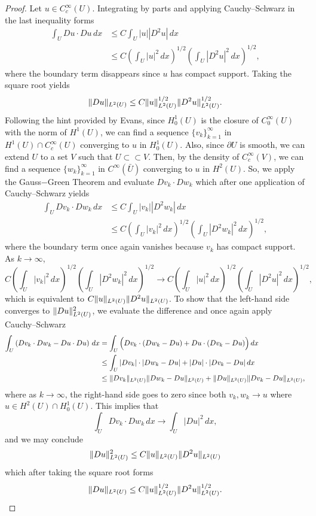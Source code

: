 \documentclass{article}
\DeclarePairedDelimiter{\norm}{\lVert}{\rVert}
\begin{document}
\begin{flushleft}
\begin{proof}
Let $u\in C_c^{\infty}(U)$. Integrating by parts and applying Cauchy–Schwarz in the last inequality forms
\begin{align*}\int_U Du\cdot Du\,dx &\le
C\int_U |u||D^2u|\,dx\quad \\&\le
C\left(\int_U |u|^2\,dx\right)^{1/2}\left(\int_U |D^2u|^2\,dx\right)^{1/2},
\end{align*}
where the boundary term disappears since $u$ has compact support. Taking the square root yields
$$\norm{Du}_{L^2(U)}\le C \norm{u}_{L^2(U)}^{1/2}\norm{D^2u}_{L^2(U)}^{1/2}.$$
Following the hint provided by Evans, since $H_0^1(U)$ is the  closure of $C_0^\infty(U)$ with the norm of $H^1(U)$, we can find a sequence $\{v_k\}_{k=1}^{\infty}$ in $H^1(U)\cap C_c^{\infty}(U)$ converging to $u$ in $H_0^1(U)$. Also, since $\partial U$ is smooth, we can extend $U$ to a set $V$ such that $U \subset \subset V$. Then, by the density of $C_c^{\infty}(V)$, we can find a sequence $\{w_k\}_{k=1}^{\infty}$ in $C^{\infty}(\bar{U})$ converging to $u$ in $H^2(U)$. So, we apply the Gauss$-$Green Theorem and evaluate $Dv_k\cdot Dw_k$ which after one application of Cauchy–Schwarz yields
\begin{align*}\int_U Dv_k\cdot Dw_k\,dx  &\le
C\int_U |v_k||D^2w_k|\,dx\\&\le
C\left(\int_U |v_k|^2\,dx\right)^{1/2}\left(\int_U |D^2w_k|^2\,dx\right)^{1/2},
\end{align*}
where the boundary term once again vanishes because $v_k$ has compact support. As $k\to\infty$,
$$C\left(\int_U |v_k|^2\,dx\right)^{1/2}\left(\int_U |D^2w_k|^2\,dx\right)^{1/2}\to C\left(\int_U |u|^2\,dx\right)^{1/2}\left(\int_U |D^2u|^2\,dx\right)^{1/2},$$
which is equivalent to $C\norm{u}_{L^2(U)}\norm{D^2u}_{L^2(U)}$. To show that the left-hand side converges to $\norm{Du}_{L^2(U)}^2$, we evaluate the difference and once again apply Cauchy–Schwarz
\begin{align*}
    \int_U\left(Dv_k\cdot Dw_k - Du\cdot Du\right)\,dx&=
    \int_U\Big(Dv_k\cdot(Dw_k-Du)+Du\cdot(Dv_k-Du)\Big)\,dx \\&\le
    \int_U |Dv_k|\cdot|Dw_k-Du|+|Du|\cdot|Dv_k-Du|\,dx\\&\le
    \norm{Dv_k}_{L^2(U)}\norm{Dw_k-Du}_{L^2(U)}+ \norm{Du}_{L^2(U)}\norm{Dv_k-Du}_{L^2(U)},
\end{align*}
where as $k\to\infty$, the right-hand side goes to zero since both $v_k,w_k \to u$ where $u\in H^2(U)\cap H_0^1(U).$ This implies that
$$\int_U Dv_k\cdot Dw_k\,dx \to \int_U |Du|^2\,dx,$$
and we may conclude 
$$\norm{Du}_{L^2(U)}^2\le C \norm{u}_{L^2(U)}\norm{D^2u}_{L^2(U)}$$
which after taking the square root forms
$$\norm{Du}_{L^2(U)}\le C \norm{u}_{L^2(U)}^{1/2}\norm{D^2u}_{L^2(U)}^{1/2}.$$
\end{proof}

\end{flushleft}
\end{document}
